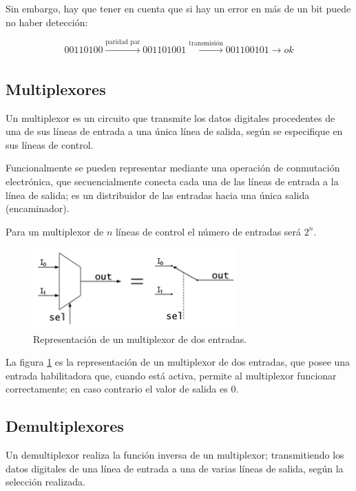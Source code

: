 \documentclass[a4paper, 11pt, titlepage]{article}
\begin{document}
		Sin embargo, hay que tener en cuenta que si hay un error en más de un bit puede no haber detección:
		
		\[00110100 \xrightarrow[]{\text{paridad par}} 001101001 \xrightarrow[]{\text{transmisión}} 001100101 \rightarrow ok\] 

	\subsection{Multiplexores}

		Un multiplexor es un circuito que transmite los datos digitales procedentes de una de sus líneas 
		de entrada a una única línea de salida, según se especifique en sus líneas de control.

		Funcionalmente se pueden representar mediante una operación de conmutación electrónica, que secuencialmente 
		conecta cada una de las líneas de entrada a la línea de salida; es un distribuidor de las entradas hacia 
		una única salida (encaminador).

		Para un multiplexor de $n$ líneas de control el número de entradas será $2^n$.

		\begin{figure}[htp]
			\centering
			\includegraphics[width=0.7\textwidth]{resources/multiplexor.png}
			\caption{Representación de un multiplexor de dos entradas.}
			\label{multiplexor}
		\end{figure}

		La figura \ref{multiplexor} es la representación de un multiplexor de dos entradas, que posee una 
		entrada habilitadora que, cuando está activa, permite al multiplexor funcionar correctamente; en caso 
		contrario el valor de salida es 0.

	\subsection{Demultiplexores}

		Un demultiplexor realiza la función inversa de un multiplexor; transmitiendo los datos digitales de una 
		línea de entrada a una de varias líneas de salida, según la selección realizada.
\end{document}

